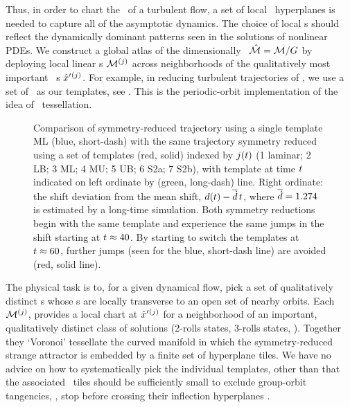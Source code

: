 Thus, in order to chart the \statesp\ of a turbulent flow, a set
of local \slice\ hyperplanes is needed to capture all of the asymptotic
dynamics. The choice of local \slice s should reflect the dynamically
dominant patterns seen in the solutions of nonlinear PDEs. We construct a
global atlas of the dimensionally \reducedsp\ $\hat{\cal M} = {\cal M}/G$ by
deploying local linear \slice s  ${\cal M}{}^{(j)}$ across neighborhoods of
the qualitatively most important \template\ {\cohStr s}
${\hat{x}'}{}^{(j)}$. For example, in reducing turbulent trajectories of
, we use a set of \reqva\ as our templates, see
. This is the periodic-orbit implementation of the
idea of {\statesp\ tessellation}.
\begin{figure}
  \centering
  \caption{\label{fig:thetadot2}
Comparison of symmetry-reduced trajectory using a single template ML
(blue, short-dash) with the same trajectory symmetry reduced using a set
of templates (red, solid) indexed by $j(t)$ (1 laminar; 2 LB; 3 ML; 4
MU; 5 UB; 6 S2a; 7 S2b), with template at time $t$ indicated on left
ordinate by (green, long-dash) line. Right ordinate: the shift deviation
from the mean shift, $d(t)-\overline{\dot{d}}\,t$,
where $\overline{\dot{d}}=1.274$ is estimated by a long-time
simulation. Both symmetry reductions begin with the same template and
experience the same jumps in the shift starting at $t\approx 40$. By
starting to switch the templates at $t\approx 60$, further jumps
(seen for the blue, short-dash line) are avoided (red, solid line).
  }
\end{figure}

The physical task is to, for a given dynamical flow, pick a set of
qualitatively distinct {\template s} whose \slice s  are locally
transverse to an open set of nearby orbits. Each \slice\ ${\cal M}{}^{(j)}$,
provides a local chart at ${\hat{x}'}{}^{(j)}$ for a neighborhood of an
important, qualitatively distinct class of solutions (2-rolls states,
3-rolls states, \etc). Together they `Voronoi' tessellate  the curved
manifold in which the symmetry-reduced strange attractor is embedded by a
finite set of hyperplane tiles. We have no advice on how to
systematically pick the individual templates, other than that the
associated \slice\ tiles should be sufficiently small to exclude
group-orbit tangencies, \ie, stop before crossing their inflection
hyperplanes .
